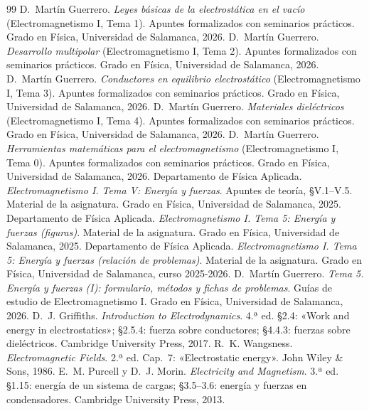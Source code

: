 \begin{thebibliography}{99}
\setlength{\itemsep}{0.25em}
\small
{} D.~Martín Guerrero. \emph{Leyes básicas de la electrostática en el vacío} (Electromagnetismo I, Tema 1). Apuntes formalizados con
  seminarios prácticos. Grado en Física, Universidad de Salamanca, 2026.
 D.~Martín Guerrero. \emph{Desarrollo multipolar} (Electromagnetismo I, Tema 2). Apuntes formalizados con seminarios prácticos. Grado
  en Física, Universidad de Salamanca, 2026.
 D.~Martín Guerrero. \emph{Conductores en equilibrio electrostático} (Electromagnetismo I, Tema 3). Apuntes formalizados con seminarios
  prácticos. Grado en Física, Universidad de Salamanca, 2026.
 D.~Martín Guerrero. \emph{Materiales dieléctricos} (Electromagnetismo I, Tema 4). Apuntes formalizados con seminarios prácticos. Grado
  en Física, Universidad de Salamanca, 2026.
 D.~Martín Guerrero. \emph{Herramientas matemáticas para el electromagnetismo} (Electromagnetismo I, Tema 0). Apuntes formalizados con
  seminarios prácticos. Grado en Física, Universidad de Salamanca, 2026.
 Departamento de Física Aplicada. \emph{Electromagnetismo I. Tema V: Energía y fuerzas}. Apuntes de teoría, §V.1--V.5. Material de
  la asignatura. Grado en Física, Universidad de Salamanca, 2025.
 Departamento de Física Aplicada. \emph{Electromagnetismo I. Tema 5: Energía y fuerzas (figuras)}. Material de la asignatura.
  Grado en Física, Universidad de Salamanca, 2025.
 Departamento de Física Aplicada. \emph{Electromagnetismo I. Tema 5: Energía y fuerzas (relación de problemas)}. Material de la
  asignatura. Grado en Física, Universidad de Salamanca, curso 2025-2026.
 D.~Martín Guerrero. \emph{Tema 5. Energía y fuerzas (I): formulario, métodos y fichas de problemas}. Guías de estudio de
  Electromagnetismo I. Grado en Física, Universidad de Salamanca, 2026.
 D.~J. Griffiths. \emph{Introduction to Electrodynamics}. 4.ª ed. §2.4: «Work and energy in electrostatics»; §2.5.4: fuerza sobre
  conductores; §4.4.3: fuerzas sobre dieléctricos. Cambridge University Press, 2017.
 R.~K. Wangsness. \emph{Electromagnetic Fields}. 2.ª ed. Cap.~7: «Electrostatic energy». John Wiley \& Sons, 1986.
 E.~M. Purcell y D.~J. Morin. \emph{Electricity and Magnetism}. 3.ª ed. §1.15: energía de un sistema de cargas; §3.5--3.6: energía y
  fuerzas en condensadores. Cambridge University Press, 2013.

\end{thebibliography}

